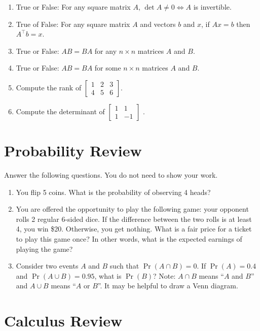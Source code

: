 \documentclass{article}
\def\blu#1{{\color{blu}#1}}
\begin{document}
\begin{enumerate}
\item True or False: For any square matrix $A$, $\det A \neq 0 \iff A$ is invertible.
\item True of False: For any square matrix $A$ and vectors $b$ and $x$, if $Ax=b$ then $A^\top b=x$.
\item True or False: $AB=BA$ for any $n\times n$ matrices $A$ and $B$.
\item True or False: $AB=BA$ for some $n\times n$ matrices $A$ and $B$.
\item \label{rankof2by3} Compute the rank of
$ \left[ \begin{array}{ccc}
1 & 2 & 3 \\
4 & 5 & 6 \end{array} \right] $.
\item Compute the determinant of
$ \left[ \begin{array}{cc}
1 & 1 \\
1 & -1 \end{array} \right] $ .
\end{enumerate}

\section{Probability Review}

\blu{Answer the following questions.} You do not need to show your work.

\begin{enumerate}

\item You flip 5 coins. What is the probability of observing 4 heads?
\item You are offered the opportunity to play the following game: your opponent rolls 2 regular 6-sided dice. If the difference between the two rolls is at least 4, you win \$20. Otherwise, you get nothing. What is a fair price for a ticket to play this game once? In other words, what is the expected earnings of playing the game?
\item Consider two events $A$ and $B$ such that $\Pr(A \cap B)=0$. If $\Pr(A) = 0.4$ and $\Pr(A \cup B) = 0.95$, what is $\Pr(B)$? Note: $A \cap B$ means
``$A$ and $B$'' and $A \cup B$ means ``$A$ or $B$''. It may be helpful to draw a Venn diagram.

\end{enumerate}

\section{Calculus Review}
\end{document}
